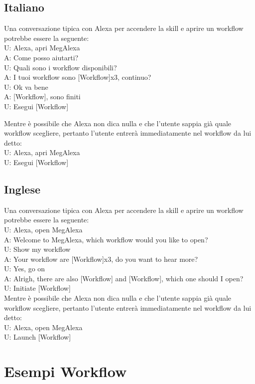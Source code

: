 \subsection{Italiano}
Una conversazione tipica con Alexa per accendere la skill e aprire un workflow potrebbe essere la seguente:\\
U: Alexa, apri MegAlexa \\
A: Come posso aiutarti? \\
U: Quali sono i workflow disponibili? \\
A: I tuoi workflow sono [Workflow]x3, continuo? \\
U: Ok va bene \\
A: [Workflow], sono finiti \\
U: Esegui [Workflow]

Mentre è possibile che Alexa non dica nulla e che l'utente sappia già quale workflow scegliere, pertanto l'utente entrerà immediatamente nel workflow da lui detto: \\
U: Alexa, apri MegAlexa\\
U: Esegui [Workflow]

\subsection{Inglese}
Una conversazione tipica con Alexa per accendere la skill e aprire un workflow potrebbe essere la seguente:\\

U: Alexa, open MegAlexa \\
A: Welcome to MegAlexa, which workflow would you like to open?\\
U: Show my workflow\\
A: Your workflow are [Workflow]x3, do you want to hear more?\\
U: Yes, go on\\
A: Alrigh, there are also [Workflow] and [Workflow], which one should I open?\\
U: Initiate [Workflow] \\

Mentre è possibile che Alexa non dica nulla e che l'utente sappia già quale workflow scegliere, pertanto l'utente entrerà immediatamente nel workflow da lui detto: \\
U: Alexa, open MegAlexa\\
U: Launch [Workflow]

\section{Esempi Workflow}
